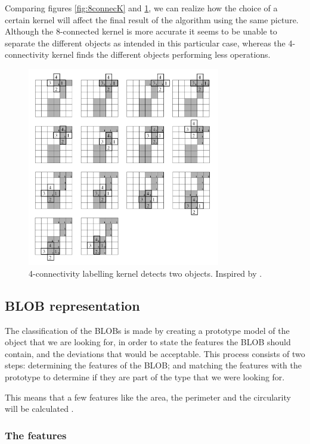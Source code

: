 Comparing figures \ref{fig:8connecK} and \ref{fig:4connecK}, we can realize how the choice of a certain kernel will affect the final result of the algorithm using the same picture. Although the 8-connected kernel is more accurate it seems to be unable to separate the different objects as intended in this particular case, whereas the 4-connectivity kernel finds the different objects performing less operations.

\begin{figure}[htbp]
\centering
\includegraphics[width=0.75\textwidth]{Pictures/Theory/4connec_kernel.png}
\caption{4-connectivity labelling kernel detects two objects. Inspired by \citep{ip_book}.}
\label{fig:4connecK}
\end{figure}

\subsection{BLOB representation}
The classification of the BLOBs is made by creating a prototype model of the object that we are looking for, in order to state the features the BLOB should contain, and the deviations that would be acceptable. This process consists of two steps: determining the features of the BLOB; and matching the features with the prototype to determine if they are part of the type that we were looking for.

This means that a few features like the area, the perimeter and the circularity will be calculated \citep{ip_book}.
\subsubsection{The features}

